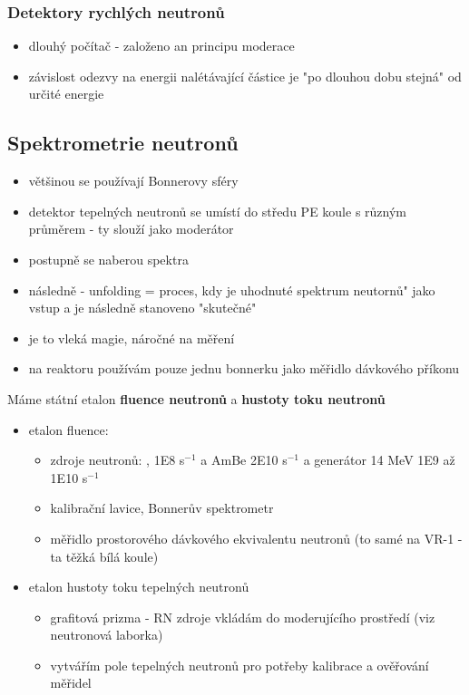 \subsubsection{Detektory rychlých neutronů}
\begin{itemize}
    \item dlouhý počítač - založeno an principu moderace
    \item závislost odezvy na energii nalétávající částice je "po dlouhou dobu stejná" od určité energie
\end{itemize}
\subsection{Spektrometrie neutronů}
\begin{itemize}
    \item většinou se používají Bonnerovy sféry
    \item detektor tepelných neutronů se umístí do středu PE koule s různým průměrem - ty slouží jako moderátor
    \item postupně se naberou spektra 
    \item následně - unfolding = proces, kdy je uhodnuté spektrum neutornů" jako vstup a je následně stanoveno "skutečné"
    \item je to vleká magie, náročné na měření
    \item na reaktoru používám pouze jednu bonnerku jako měřidlo dávkového příkonu
\end{itemize}
Máme státní etalon \textbf{fluence neutronů} a \textbf{hustoty toku neutronů}
\begin{itemize}
    \item etalon fluence:
    \begin{itemize}
        \item zdroje neutronů: , 1E8 s$^{-1}$ a AmBe 2E10 s$^{-1}$ a generátor 14 MeV 1E9 až 1E10 s$^{-1}$
        \item kalibrační lavice, Bonnerův spektrometr
        \item měřidlo prostorového dávkového ekvivalentu neutronů (to samé na VR-1 - ta těžká bílá koule)
    \end{itemize}
    \item etalon hustoty toku tepelných neutronů
    \begin{itemize}
        \item grafitová prizma - RN zdroje vkládám do moderujícího prostředí (viz neutronová laborka)
        \item vytvářím pole tepelných neutronů pro potřeby kalibrace a ověřování měřidel
    \end{itemize}
\end{itemize}


